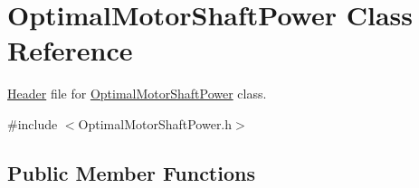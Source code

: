 \hypertarget{class_optimal_motor_shaft_power}{}\section{Optimal\+Motor\+Shaft\+Power Class Reference}
\label{class_optimal_motor_shaft_power}


\hyperlink{class_header}{Header} file for \hyperlink{class_optimal_motor_shaft_power}{Optimal\+Motor\+Shaft\+Power} class.  




{\ttfamily \#include $<$Optimal\+Motor\+Shaft\+Power.\+h$>$}

\subsection*{Public Member Functions}
